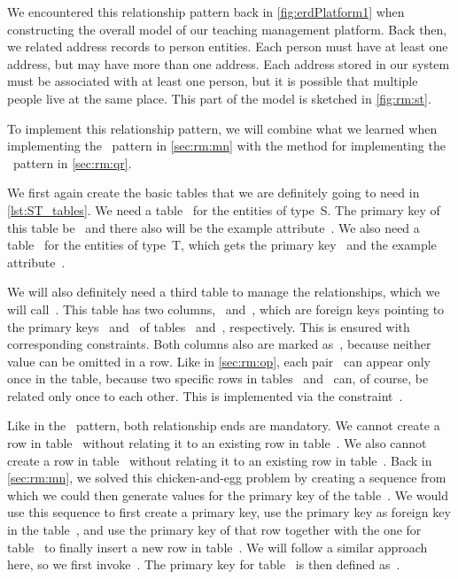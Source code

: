 We encountered this relationship pattern back in \cref{fig:erdPlatform1} when constructing the overall model of our teaching management platform.
Back then, we related address records to person entities.
Each person must have at least one address, but may have more than one address.
Each address stored in our system must be associated with at least one person, but it is possible that multiple people live at the same place.
This part of the model is sketched in \cref{fig:rm:st}.

To implement this relationship pattern, we will combine what we learned when implementing the ~pattern in \cref{sec:rm:mn} with the method for implementing the ~pattern in \cref{sec:rm:qr}.

We first again create the basic tables that we are definitely going to need in \cref{lst:ST_tables}.
We need a table~ for the entities of type~S.
The primary key of this table be~ and there also will be the example attribute~.
We also need a table~ for the entities of type~T, which gets the primary key~ and the example attribute~.%
%
\begin{sloppypar}%
We will also definitely need a third table to manage the relationships, which we will call~.
This table has two columns,~ and~, which are foreign keys pointing to the primary keys~ and~ of tables~ and~, respectively.
This is ensured with corresponding  constraints.
Both columns also are marked as~, because neither value can be omitted in a row.
Like in \cref{sec:rm:op}, each pair~ can appear only once in the table, because two specific rows in tables~ and~ can, of course, be related only once to each other.
This is implemented via the constraint~.%
\end{sloppypar}%
%
Like in the ~pattern, both relationship ends are mandatory.
We cannot create a row in table~ without relating it to an existing row in table~.
We also cannot create a row in table~ without relating it to an existing row in table~.
Back in \cref{sec:rm:mn}, we solved this chicken-and-egg problem by creating a sequence from which we could then generate values for the primary key of the table~.
We would use this sequence to first create a primary key, use the primary key as foreign key in the table~, and use the primary key of that row together with the one for table~ to finally insert a new row in table~.
We will follow a similar approach here, so we first invoke~.
The primary key for table~ is then defined as~.

